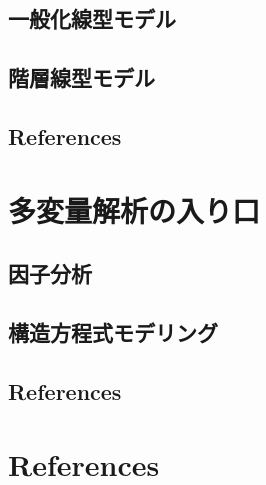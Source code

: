 \documentclass[
  a4paper,
]{ltjsbook}
\begin{document}
\section{一般化線型モデル}\label{ux4e00ux822cux5316ux7ddaux578bux30e2ux30c7ux30eb}

\section{階層線型モデル}\label{ux968eux5c64ux7ddaux578bux30e2ux30c7ux30eb}

\section{References}\label{references-5}



\chapter{多変量解析の入り口}\label{ux591aux5909ux91cfux89e3ux6790ux306eux5165ux308aux53e3}

\section{因子分析}\label{ux56e0ux5b50ux5206ux6790}

\section{構造方程式モデリング}\label{ux69cbux9020ux65b9ux7a0bux5f0fux30e2ux30c7ux30eaux30f3ux30b0}

\section{References}\label{references-6}



\chapter{References}\label{references-7}



\printbibliography[title=引用文献]
\end{document}

